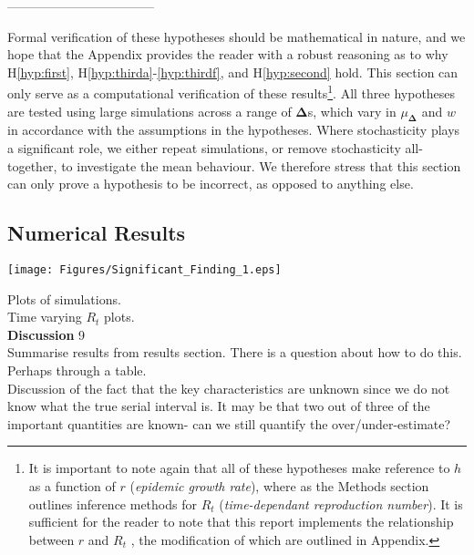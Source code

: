 \documentclass[10pt,journal,compsoc]{IEEEtran}
\begin{document}
-----------------------------------


Formal verification of these hypotheses should be mathematical in nature, and we hope that the Appendix provides the reader with a robust reasoning as to why H\ref{hyp:first}, H\ref{hyp:thirda}-\ref{hyp:thirdf}, and H\ref{hyp:second} hold. This section can only serve as a computational verification of these results\footnote{It is important to note again that all of these hypotheses make reference to $h$ as a function of $r$ (\textit{epidemic growth rate}), where as the Methods section outlines inference methods for $R_t$ (\textit{time-dependant reproduction number}). It is sufficient for the reader to note that this report implements the relationship between $r$ and $R_t$ \cite{Wallinga-Lipsitch}, the modification of which are outlined in Appendix.}. All three hypotheses are tested using large simulations across a range of $\boldsymbol{\Delta}$s, which vary in $\mu_{\boldsymbol{\Delta}}$ and $w$ in accordance with the assumptions in the hypotheses. Where stochasticity plays a significant role, we either repeat simulations, or remove stochasticity all-together, to investigate the mean behaviour. We therefore stress that this section can only prove a hypothesis to be incorrect, as opposed to anything else.\\



\subsection{Numerical Results}

\begin{minipage}{0.95\linewidth}
\centering
\texttt{[image: Figures/Significant\_Finding\_1.eps]}
\label{fig:Significant_Finding}
\end{minipage}

Plots of simulations.\\

Time varying $R_t$ plots.\\

\textbf{Discussion} 9\\

Summarise results from results section. There is a question about how to do this. Perhaps through a table.\\

Discussion of the fact that the key characteristics are unknown since we do not know what the true serial interval is. It may be that two out of three of the important quantities are known- can we still quantify the over/under-estimate?\\
\end{document}
